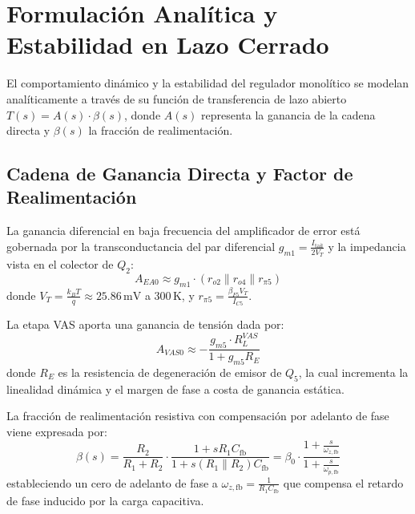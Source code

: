 \section{Formulación Analítica y Estabilidad en Lazo Cerrado}
\label{sec:closed_loop_stability}

El comportamiento dinámico y la estabilidad del regulador monolítico se modelan analíticamente a través de su función de transferencia de lazo abierto $T(s) = A(s) \cdot \beta(s)$, donde $A(s)$ representa la ganancia de la cadena directa y $\beta(s)$ la fracción de realimentación.

\subsection{Cadena de Ganancia Directa y Factor de Realimentación}

La ganancia diferencial en baja frecuencia del amplificador de error está gobernada por la transconductancia del par diferencial $g_{m1} = \frac{I_{\mathrm{tail}}}{2 V_T}$ y la impedancia vista en el colector de $Q_2$:
\begin{equation}
    A_{EA0} \approx g_{m1} \cdot \left( r_{o2} \parallel r_{o4} \parallel r_{\pi 5} \right)
\end{equation}
donde $V_T = \frac{k_B T}{q} \approx 25.86\,\mathrm{mV}$ a $300\,\mathrm{K}$, y $r_{\pi 5} = \frac{\beta_{F5} V_T}{I_{C5}}$.

La etapa VAS aporta una ganancia de tensión dada por:
\begin{equation}
    A_{VAS0} \approx - \frac{g_{m5} \cdot R_L^{VAS}}{1 + g_{m5} R_E}
\end{equation}
donde $R_E$ es la resistencia de degeneración de emisor de $Q_5$, la cual incrementa la linealidad dinámica y el margen de fase a costa de ganancia estática.

La fracción de realimentación resistiva con compensación por adelanto de fase viene expresada por:
\begin{equation}
    \beta(s) = \frac{R_2}{R_1 + R_2} \cdot \frac{1 + s R_1 C_{\mathrm{fb}}}{1 + s (R_1 \parallel R_2) C_{\mathrm{fb}}} = \beta_0 \cdot \frac{1 + \frac{s}{\omega_{z,\mathrm{fb}}}}{1 + \frac{s}{\omega_{p,\mathrm{fb}}}}
\end{equation}
estableciendo un cero de adelanto de fase a $\omega_{z,\mathrm{fb}} = \frac{1}{R_1 C_{\mathrm{fb}}}$ que compensa el retardo de fase inducido por la carga capacitiva.

